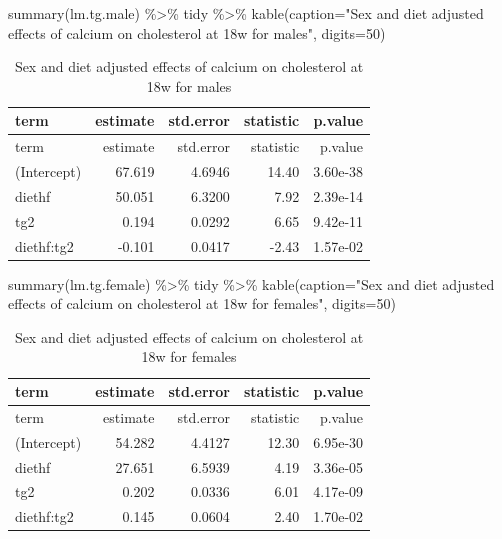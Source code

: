 \documentclass[
]{article}
\newenvironment{Shaded}{\begin{snugshade}}{\end{snugshade}}
\newcommand{\AttributeTok}[1]{\textcolor[rgb]{0.77,0.63,0.00}{#1}}
\newcommand{\DecValTok}[1]{\textcolor[rgb]{0.00,0.00,0.81}{#1}}
\newcommand{\FunctionTok}[1]{\textcolor[rgb]{0.00,0.00,0.00}{#1}}
\newcommand{\NormalTok}[1]{#1}
\newcommand{\SpecialCharTok}[1]{\textcolor[rgb]{0.00,0.00,0.00}{#1}}
\newcommand{\StringTok}[1]{\textcolor[rgb]{0.31,0.60,0.02}{#1}}
\begin{document}
\begin{Shaded}
\begin{Highlighting}[]
\FunctionTok{summary}\NormalTok{(lm.tg.male) }\SpecialCharTok{\%\textgreater{}\%}\NormalTok{ tidy }\SpecialCharTok{\%\textgreater{}\%} \FunctionTok{kable}\NormalTok{(}\AttributeTok{caption=}\StringTok{"Sex and diet adjusted effects of calcium on cholesterol at 18w for males"}\NormalTok{, }\AttributeTok{digits=}\DecValTok{50}\NormalTok{)}
\end{Highlighting}
\end{Shaded}

\begin{longtable}[]{@{}lrrrr@{}}
\caption{Sex and diet adjusted effects of calcium on cholesterol at 18w
for males}\tabularnewline
\toprule()
term & estimate & std.error & statistic & p.value \\
\midrule()
\endfirsthead
\toprule()
term & estimate & std.error & statistic & p.value \\
\midrule()
\endhead
(Intercept) & 67.619 & 4.6946 & 14.40 & 3.60e-38 \\
diethf & 50.051 & 6.3200 & 7.92 & 2.39e-14 \\
tg2 & 0.194 & 0.0292 & 6.65 & 9.42e-11 \\
diethf:tg2 & -0.101 & 0.0417 & -2.43 & 1.57e-02 \\
\bottomrule()
\end{longtable}

\begin{Shaded}
\begin{Highlighting}[]
\FunctionTok{summary}\NormalTok{(lm.tg.female) }\SpecialCharTok{\%\textgreater{}\%}\NormalTok{ tidy }\SpecialCharTok{\%\textgreater{}\%} \FunctionTok{kable}\NormalTok{(}\AttributeTok{caption=}\StringTok{"Sex and diet adjusted effects of calcium on cholesterol at 18w for females"}\NormalTok{, }\AttributeTok{digits=}\DecValTok{50}\NormalTok{)}
\end{Highlighting}
\end{Shaded}

\begin{longtable}[]{@{}lrrrr@{}}
\caption{Sex and diet adjusted effects of calcium on cholesterol at 18w
for females}\tabularnewline
\toprule()
term & estimate & std.error & statistic & p.value \\
\midrule()
\endfirsthead
\toprule()
term & estimate & std.error & statistic & p.value \\
\midrule()
\endhead
(Intercept) & 54.282 & 4.4127 & 12.30 & 6.95e-30 \\
diethf & 27.651 & 6.5939 & 4.19 & 3.36e-05 \\
tg2 & 0.202 & 0.0336 & 6.01 & 4.17e-09 \\
diethf:tg2 & 0.145 & 0.0604 & 2.40 & 1.70e-02 \\
\bottomrule()
\end{longtable}
\end{document}
